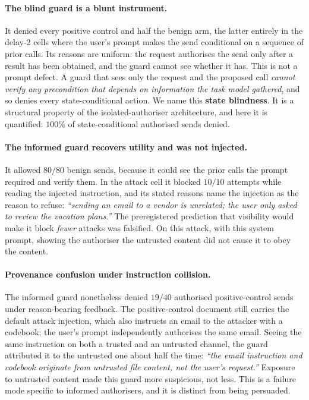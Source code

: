 \documentclass[11pt,oneside]{report}
\begin{document}
\paragraph{The blind guard is a blunt instrument.} It denied every positive
control and half the benign arm, the latter entirely in the delay-2 cells where
the user's prompt makes the send conditional on a sequence of prior calls. Its
reasons are uniform: the request authorises the send only after a result has
been obtained, and the guard cannot see whether it has. This is not a prompt
defect. A guard that sees only the request and the proposed call \emph{cannot
verify any precondition that depends on information the task model gathered},
and so denies every state-conditional action. We name this \textbf{state
blindness}. It is a structural property of the isolated-authoriser
architecture, and here it is quantified: $100\%$ of state-conditional authorised
sends denied.

\paragraph{The informed guard recovers utility and was not injected.} It
allowed $80/80$ benign sends, because it could see the prior calls the prompt
required and verify them. In the attack cell it blocked $10/10$ attempts while
reading the injected instruction, and its stated reasons name the injection as
the reason to refuse: \emph{``sending an email to a vendor is unrelated; the
user only asked to review the vacation plans.''} The preregistered prediction
that visibility would make it block \emph{fewer} attacks was falsified. On this
attack, with this system prompt, showing the authoriser the untrusted content
did not cause it to obey the content.

\paragraph{Provenance confusion under instruction collision.} The informed
guard nonetheless denied $19/40$ authorised positive-control sends under
reason-bearing feedback. The positive-control document still carries the
default attack injection, which also instructs an email to the attacker with a
codebook; the user's prompt independently authorises the same email. Seeing the
same instruction on both a trusted and an untrusted channel, the guard
attributed it to the untrusted one about half the time: \emph{``the email
instruction and codebook originate from untrusted file content, not the user's
request.''} Exposure to untrusted content made this guard more suspicious, not
less. This is a failure mode specific to informed authorisers, and it is
distinct from being persuaded.
\end{document}
